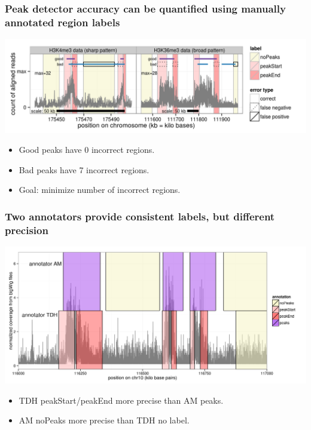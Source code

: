 \documentclass{beamer}
\begin{document}
\begin{frame}
  \frametitle{Peak detector accuracy can be quantified using manually
    annotated region labels}
  
  \includegraphics[width=1.1\textwidth]{figure-dp-peaks-train}

  \begin{itemize}
  \item Good peaks have 0 incorrect regions.
  \item Bad peaks have 7 incorrect regions.
  \item Goal: minimize number of incorrect regions.
  \end{itemize}

\end{frame}

\begin{frame}
  \frametitle{Two annotators provide consistent labels, but different
    precision}
  \includegraphics[width=1.1\textwidth]{figure-several-annotators}

  \begin{itemize}
  \item TDH peakStart/peakEnd more precise than AM peaks.
  \item AM noPeaks more precise than TDH no label.
  \end{itemize}
\end{frame}
\end{document}
